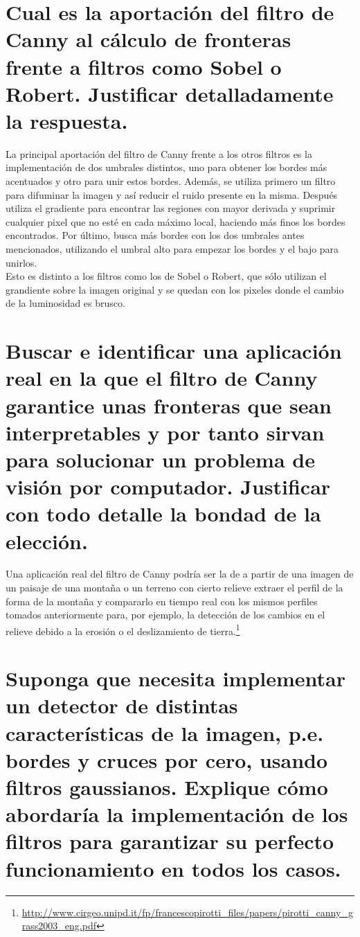 \section{Cual es la aportación del filtro de Canny al cálculo de fronteras frente a filtros como Sobel o Robert. Justificar detalladamente la respuesta.}

La principal aportación del filtro de Canny frente a los otros filtros es la implementación de dos umbrales distintos, uno para obtener los bordes más acentuados y otro para unir estos bordes. Además, se utiliza primero un filtro para difuminar la imagen y así reducir el ruido presente en la misma. Después utiliza el gradiente para encontrar las regiones con mayor derivada y suprimir cualquier pixel que no esté en cada máximo local, haciendo más finos los bordes encontrados. Por último, busca más bordes con los dos umbrales antes mencionados, utilizando el umbral alto para empezar los bordes y el bajo para unirlos.\\

Esto es distinto a los filtros como los de Sobel o Robert, que sólo utilizan el grandiente sobre la imagen original y se quedan con los pixeles donde el cambio de la luminosidad es brusco.


\section{Buscar e identificar una aplicación real en la que el filtro de Canny garantice unas fronteras que sean interpretables y por tanto sirvan para solucionar un problema de visión por computador. Justificar con todo detalle la bondad de la elección.}

Una aplicación real del filtro de Canny podría ser la de a partir de una imagen de un paisaje de una montaña o un terreno con cierto relieve extraer el perfil de la forma de la montaña y compararlo en tiempo real con los mismos perfiles tomados anteriormente para, por ejemplo, la detección de los cambios en el relieve debido a la erosión o el deslizamiento de tierra.\footnote{\url{http://www.cirgeo.unipd.it/fp/francescopirotti_files/papers/pirotti_canny_grass2003_eng.pdf}}

\section{Suponga que necesita implementar un detector de distintas características de la imagen, p.e. bordes y cruces por cero, usando filtros gaussianos. Explique cómo abordaría la implementación de los filtros para garantizar su perfecto funcionamiento en todos los casos.}



